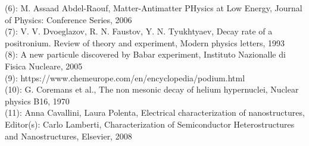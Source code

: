 \documentclass[preview]{standalone}
\begin{document}
\begin{center}
(6): M. Assaad Abdel-Raouf, Matter-Antimatter PHysics at Low Energy, Journal of Physics: Conference Series, 2006\\ (7): V. V. Dvoeglazov, R. N. Faustov, Y. N. Tyukhtyaev, Decay rate of a positronium. Review of theory and experiment, Modern physics letters, 1993\\ (8): A new particule discovered by Babar experiment, Instituto Nazionalle di Fisica Nucleare, 2005\\ (9): https://www.chemeurope.com/en/encyclopedia/podium.html\\ (10): G. Coremans et al., The non mesonic decay of helium hypernuclei, Nuclear physics B16, 1970\\ (11): Anna Cavallini, Laura Polenta, Electrical characterization of nanostructures, Editor(s): Carlo Lamberti, Characterization of Semiconductor Heterostructures and Nanostructures, Elsevier, 2008
\end{center}
\end{document}
